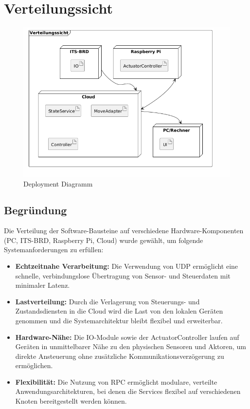 \chapter{Verteilungssicht}
\begin{figure}[h!]
	\centering
	\includegraphics[scale=.5]{diagrams/deploymentView.png}
	\caption{Deployment Diagramm}
	\label{fig:deployment-prod-grafik}
\end{figure}

\section{Begründung}

Die Verteilung der Software-Bausteine auf verschiedene Hardware-Komponenten (PC, ITS-BRD, Raspberry Pi, Cloud) wurde gewählt, um folgende Systemanforderungen zu erfüllen:

\begin{itemize}
    \item \textbf{Echtzeitnahe Verarbeitung:} Die Verwendung von UDP ermöglicht eine schnelle, verbindungslose Übertragung von Sensor- und Steuerdaten mit minimaler Latenz.
    \item \textbf{Lastverteilung:} Durch die Verlagerung von Steuerungs- und Zustandsdiensten in die Cloud wird die Last von den lokalen Geräten genommen und die Systemarchitektur bleibt flexibel und erweiterbar.
    \item \textbf{Hardware-Nähe:} Die IO-Module sowie der ActuatorController laufen auf Geräten in unmittelbarer Nähe zu den physischen Sensoren und Aktoren, um direkte Ansteuerung ohne zusätzliche Kommunikationsverzögerung zu ermöglichen.
    \item \textbf{Flexibilität:} Die Nutzung von RPC ermöglicht modulare, verteilte Anwendungsarchitekturen, bei denen die Services flexibel auf verschiedenen Knoten bereitgestellt werden können.
\end{itemize}

